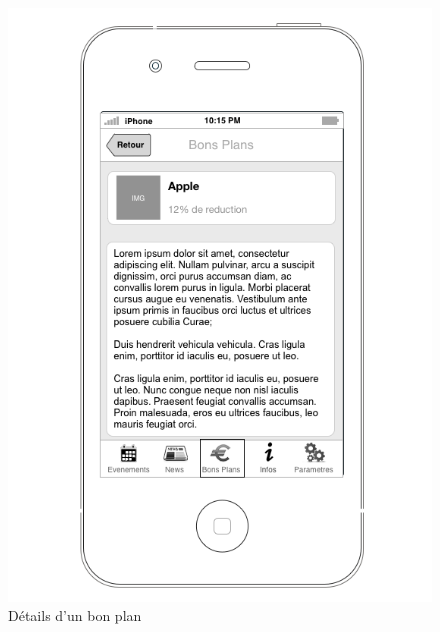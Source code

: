 \documentclass[a4paper, 11px]{article}
\begin{document}
\begin{figure}[htbp]
\begin{minipage}[c]{.50\linewidth}
	\end{minipage}
	\hfill
	\begin{minipage}[c]{.50\linewidth}
		\begin{center}
			\includegraphics[scale=0.29]{../../Sketch/iOS/bons_plans_detail.png}
		\end{center}
	\caption{Détails d'un bon plan}

	\end{minipage}
\end{figure}
\end{document}
